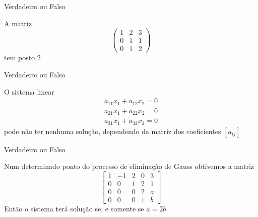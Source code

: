 \documentclass{beamer}
\begin{document}
\begin{frame}{Verdadeiro ou Falso}
  \begin{block}{2}
  A matriz 
  $$ \begin{pmatrix}
    1 & 2 & 3 \\ 
    0 & 1 & 1 \\
    0 & 1 & 2
  \end{pmatrix}$$ tem posto $2$
\end{block}
\end{frame}

\begin{frame}{Verdadeiro ou Falso}
  \begin{block}{3}
  O sistema linear 
  \begin{gather*}
    a_{11}x_1 + a_{12}x_2 = 0 \\
    a_{21}x_1 + a_{22}x_2 = 0 \\
    a_{31}x_1 + a_{32}x_2 = 0
  \end{gather*} pode não ter nenhuma solução, dependendo da matriz dos 
  coeficientes $[a_{ij}]$
\end{block}
\end{frame}   

\begin{frame}{Verdadeiro ou Falso}
  \begin{block}{4}
  Num determinado ponto do processo de eliminação de Gauss obtivemos 
  a matriz
  $$ \left[ 
  \begin{array}{cccc|c}
    1 & -1 & 2 & 0 & 3 \\
    0 & 0 & 1  & 2 & 1 \\
    0 & 0 & 0  & 2 & a \\
    0 & 0 & 0 & 1 & b
  \end{array}  
  \right]$$
  Então o sistema terá solução se, e somente se $a=2b$
\end{block}
\end{frame}
\end{document}
